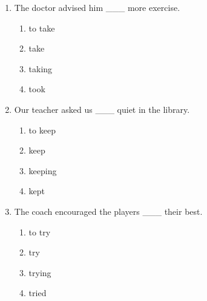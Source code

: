 \documentclass[11pt,a4paper]{ctexart}
\begin{document}
\begin{enumerate}[leftmargin=*,itemsep=4pt]
\begin{enumerate}[label=\Alph*.,leftmargin=2em,itemsep=1pt,topsep=2pt]
\item to not play
\item playing
\end{enumerate}
\item The doctor advised him \_\_\_ more exercise.
\begin{enumerate}[label=\Alph*.,leftmargin=2em,itemsep=1pt,topsep=2pt]
\item to take
\item take
\item taking
\item took
\end{enumerate}
\item Our teacher asked us \_\_\_ quiet in the library.
\begin{enumerate}[label=\Alph*.,leftmargin=2em,itemsep=1pt,topsep=2pt]
\item to keep
\item keep
\item keeping
\item kept
\end{enumerate}
\item The coach encouraged the players \_\_\_ their best.
\begin{enumerate}[label=\Alph*.,leftmargin=2em,itemsep=1pt,topsep=2pt]
\item to try
\item try
\item trying
\item tried
\end{enumerate}
\end{enumerate}
\end{document}
